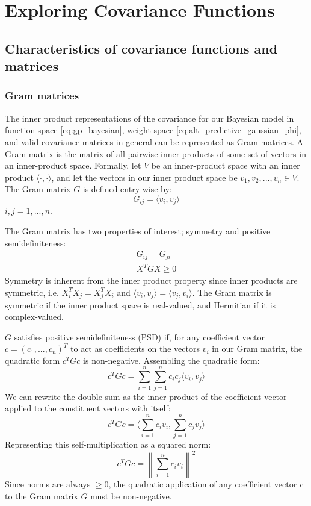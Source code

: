 \section{Exploring Covariance Functions}

\subsection{Characteristics of covariance functions and matrices}

\subsubsection{Gram matrices}
The inner product representations of the covariance for our Bayesian model in function-space \ref{eq:gp_bayesian}, weight-space \ref{eq:alt_predictive_gaussian_phi}, and valid covariance matrices in general can be represented as Gram matrices. \cite{gp-ml} A Gram matrix is the matrix of all pairwise inner products of some set of vectors in an inner-product space. Formally, let $V$ be an inner-product space with an inner product $\langle \cdot, \cdot \rangle$, and let the vectors in our inner product space be $v_1, v_2, ..., v_n \in V$. The Gram matrix $G$ is defined entry-wise by:
\begin{equation*}
    G_{ij} = \langle v_i, v_j \rangle
\end{equation*}
$i, j = 1, ..., n$.

The Gram matrix has two properties of interest; symmetry and positive semidefiniteness:
\begin{equation*}
    \begin{aligned}
        G_{ij} = G_{ji} \\
        X^T G X \geq 0
    \end{aligned}
\end{equation*}
Symmetry is inherent from the inner product property since inner products are symmetric, i.e. $X_i^T X_j = X_j^T X_i$ and $\langle v_i, v_j \rangle = \langle v_j, v_i \rangle$. The Gram matrix is symmetric if the inner product space is real-valued, and Hermitian if it is complex-valued.

$G$ satisfies positive semidefiniteness (PSD) if, for any coefficient vector $c = (c_1, ..., c_n)^T$ to act as coefficients on the vectors $v_i$ in our Gram matrix, the quadratic form $c^T G c$ is non-negative. Assembling the quadratic form:
\begin{equation*}
    c^T G c = \sum_{i=1}^n \sum_{j=1}^n c_i c_j \langle v_i, v_j \rangle
\end{equation*}
We can rewrite the double sum as the inner product of the coefficient vector applied to the constituent vectors with itself:
\begin{equation*}
    c^T G c = \langle \sum_{i=1}^n c_i v_i, \sum_{j=1}^n c_j v_j \rangle
\end{equation*}
Representing this self-multiplication as a squared norm:
\begin{equation*}
    c^T G c = \left\| \sum_{i=1}^n c_i v_i \right\|^2
\end{equation*}
Since norms are always $\geq 0$, the quadratic application of any coefficient vector $c$ to the Gram matrix $G$ must be non-negative. 

